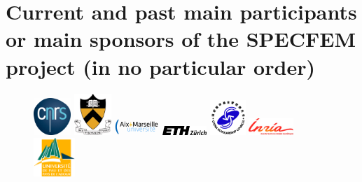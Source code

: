 \section*{Current and past main participants or main sponsors of the SPECFEM project (in no particular order)}
%
\begin{figure}[htbp]
\noindent \begin{centering}
\includegraphics[width=0.125\textwidth]{figures/logo_cnrs.png}\vspace*{2truemm}
\includegraphics[width=0.125\textwidth]{figures/logo_princeton.jpg}\vspace*{2truemm}
\includegraphics[width=0.15\textwidth]{figures/logo_aix_marseille_universite.png}\vspace*{0.02truemm}
\includegraphics[width=0.15\textwidth]{figures/logo_ETH.jpg}\vspace*{2truemm}
\includegraphics[width=0.12\textwidth]{figures/logo_CSC_China.jpg}\vspace*{0.02truemm}
\includegraphics[width=0.15\textwidth]{figures/logo_inria.jpg}\vspace*{2truemm}
\includegraphics[width=0.14\textwidth]{figures/logo_UPPA.png}
\par\end{centering}

\end{figure}
